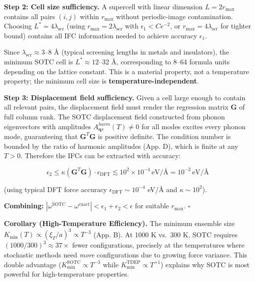\documentclass[aps,prb,reprint,amsmath,amssymb,floatfix]{revtex4-2}
\begin{document}
\textbf{Step 2: Cell size sufficiency.} A supercell with linear
dimension \(L = 2r_\text{max}\) contains all pairs \((i,j)\) within
\(r_\text{max}\) without periodic-image contamination. Choosing
\(L^* = 4\lambda_\text{scr}\) (using
\(r_\text{max} = 2\lambda_\text{scr}\) with \(\epsilon_1 < C e^{-2}\),
or \(r_\text{max} = 4\lambda_\text{scr}\) for tighter bound) contains
all IFC information needed to achieve accuracy \(\epsilon_1\).

Since \(\lambda_\text{scr} \approx 3\)--8 Å (typical screening lengths
in metals and insulators), the minimum SOTC cell is
\(L^* \approx 12\)--32 Å, corresponding to 8--64 formula units depending
on the lattice constant. This is a material property, not a temperature
property; the minimum cell size is \textbf{temperature-independent}.

\textbf{Step 3: Displacement field sufficiency.} Given a cell large
enough to contain all relevant pairs, the displacement field must render
the regression matrix \(\mathbf{G}\) of full column rank. The SOTC
displacement field constructed from phonon eigenvectors with amplitudes
\(A_{\mathbf{q}s}^{harm}(T) \neq 0\) for all modes excites every phonon
mode, guaranteeing that \(\mathbf{G}^T\mathbf{G}\) is positive definite.
The condition number is bounded by the ratio of harmonic amplitudes
(App. D), which is finite at any \(T > 0\). Therefore the IFCs can be
extracted with accuracy:

\begin{equation*}
\epsilon_2 \leq \kappa(\mathbf{G}^T\mathbf{G})\cdot\epsilon_\text{DFT} \lesssim 10^2 \times 10^{-4}\,\text{eV/Å} = 10^{-2}\,\text{eV/Å}
\end{equation*}

(using typical DFT force accuracy \(\epsilon_\text{DFT} \sim 10^{-4}\)
eV/Å and \(\kappa \sim 10^2\)).

\textbf{Combining:}
\(|\omega^\text{SOTC} - \omega^\text{exact}| < \epsilon_1 + \epsilon_2 < \epsilon\)
for suitable \(r_\text{max}\). \(\square\)

\textbf{Corollary (High-Temperature Efficiency).} The minimum ensemble
size \(K_\text{min}(T) \propto (\xi_T/a)^3 \propto T^{-3}\) (App. B). At
1000 K vs.~300 K, SOTC requires \((1000/300)^3 \approx 37\times\) fewer
configurations, precisely at the temperatures where stochastic methods
need \emph{more} configurations due to growing force variance. This
double advantage (\(K^\text{SOTC}_\text{min}\propto T^{-3}\) while
\(K^\text{TDEP}_\text{min}\propto T^{+1}\)) explains why SOTC is most
powerful for high-temperature properties.
\end{document}
